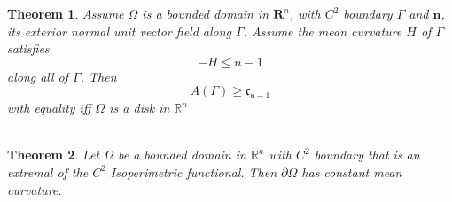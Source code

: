 \documentclass[oneside]{book}
\newtheorem{theorem}{Theorem}[section]
\begin{document}
	
	
	
	\hfill \break
	
	\begin{theorem}
		\label{t:5}
		Assume $\Omega$ is a bounded domain in $\mathbf{R}^{n}$, with $C^{2}$ boundary $\Gamma$
		and $\mathbf{n}$, its exterior normal unit vector field along $\Gamma$. Assume the mean curvature
		$H$ of $\Gamma$ satisfies
		$$
		-H \leq n-1
		$$
		along all of $\Gamma$. Then
		$$
		A(\Gamma) \geq \mathfrak{c}_{\mathfrak{n}-1}
		$$
		with equality iff $\Omega$ is a disk in $\mathbb{R}^{n}$ \\\\
	\end{theorem}
	
	
	
	
	
	\begin{theorem}
		\label{t:5.5}
		Let $\Omega$ be a bounded domain in $\mathbb{R}^{n}$ with $C^{2}$ boundary that is an extremal of the $C^{2}$ Isoperimetric functional. Then  $\partial \Omega$ has constant mean curvature.
	\end{theorem}
	
	
	
	
	
\end{document}
